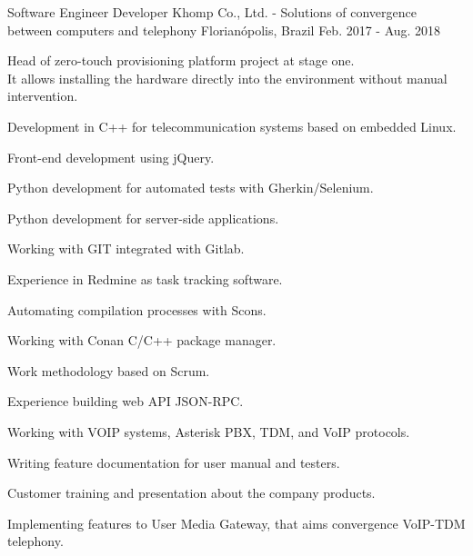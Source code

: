 \begin{cventries}
  \cventry
    {Software Engineer Developer} %
    {Khomp Co., Ltd. - Solutions of convergence between computers and telephony} %
    {Florianópolis, Brazil} %
    {Feb. 2017 - Aug. 2018} %
    {
      \begin{cvitems} %
        \item {Head of zero-touch provisioning platform project at stage one. \\
	It allows installing the hardware directly into the environment without manual intervention.}
        \item {Development in C++ for telecommunication systems based on embedded Linux.}
        \item {Front-end development using jQuery.}
        \item {Python development for automated tests with Gherkin/Selenium.}
        \item {Python development for server-side applications.}
        \item {Working with GIT integrated with Gitlab.}
        \item {Experience in Redmine as task tracking software.}
        \item {Automating compilation processes with Scons.}
        \item {Working with Conan C/C++ package manager.}
        \item {Work methodology based on Scrum.}
        \item {Experience building web API JSON-RPC.}
        \item {Working with VOIP systems, Asterisk PBX, TDM, and VoIP protocols.}
        \item {Writing feature documentation for user manual and testers.}
        \item {Customer training and presentation about the company products.}
        \item {Implementing features to User Media Gateway, that aims convergence VoIP-TDM telephony.}
      \end{cvitems}
    }


\end{cventries}
